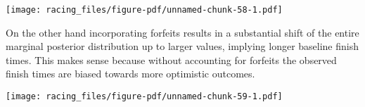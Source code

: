 \documentclass[
  letterpaper,
  DIV=11,
  numbers=noendperiod]{scrartcl}
\newenvironment{Shaded}{\begin{snugshade}}{\end{snugshade}}
\newcommand{\AttributeTok}[1]{\textcolor[rgb]{0.40,0.45,0.13}{#1}}
\newcommand{\ConstantTok}[1]{\textcolor[rgb]{0.56,0.35,0.01}{#1}}
\newcommand{\DecValTok}[1]{\textcolor[rgb]{0.68,0.00,0.00}{#1}}
\newcommand{\FloatTok}[1]{\textcolor[rgb]{0.68,0.00,0.00}{#1}}
\newcommand{\FunctionTok}[1]{\textcolor[rgb]{0.28,0.35,0.67}{#1}}
\newcommand{\NormalTok}[1]{\textcolor[rgb]{0.00,0.23,0.31}{#1}}
\newcommand{\SpecialCharTok}[1]{\textcolor[rgb]{0.37,0.37,0.37}{#1}}
\newcommand{\StringTok}[1]{\textcolor[rgb]{0.13,0.47,0.30}{#1}}
\begin{document}
\texttt{[image: racing\_files/figure-pdf/unnamed-chunk-58-1.pdf]}

On the other hand incorporating forfeits results in a substantial shift
of the entire marginal posterior distribution up to larger values,
implying longer baseline finish times. This makes sense because without
accounting for forfeits the observed finish times are biased towards
more optimistic outcomes.

\begin{Shaded}
\end{Shaded}

\texttt{[image: racing\_files/figure-pdf/unnamed-chunk-59-1.pdf]}
\end{document}
